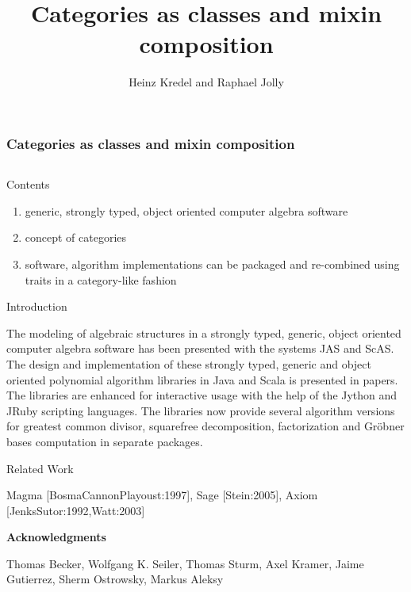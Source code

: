 \documentclass[final]{beamer}
\title[Categories and Mixins]{Categories as classes and mixin composition}
\author[Kredel \& Jolly]{Heinz Kredel\inst{1} and Raphael Jolly\inst{2}}
\institute{IT-Center, University of Mannheim, Germany %
\and Databeans, Paris, France%
}
\begin{document}

\begin{frame}[fragile] 
\frametitle{Categories as classes and mixin composition}
\vfill

\begin{columns}[t]

\begin{column}{.3\linewidth}
 
  \begin{block}{\large Contents}
{\normalsize 
  \begin{enumerate}
  \item generic, strongly typed, object oriented computer algebra software
  \item concept of categories 
  \item software, algorithm implementations can be packaged and
    re-combined using traits in a category-like fashion
  \end{enumerate}
\par}\par
  \end{block}
  \hfill
  \begin{block}{\large Introduction}
{\footnotesize 
The modeling of algebraic structures in a strongly typed, generic,
object oriented computer algebra software has been presented with the
systems JAS and ScAS.
The design and implementation of these strongly typed, generic and
object oriented polynomial algorithm libraries in Java and Scala is
presented in papers.  
The libraries are enhanced for interactive usage with the help of the Jython and
JRuby scripting languages. The libraries now
provide several algorithm versions for greatest common divisor,
squarefree decomposition, factorization and Gr\"obner bases
computation in separate packages.
\par}\par
  \end{block}
  \hfill
  \begin{block}{\large Related Work}
{\normalsize 
Magma [BosmaCannonPlayoust:1997], Sage [Stein:2005], 
Axiom [JenksSutor:1992,Watt:2003]\par
}\par
{\footnotesize\bf Acknowledgments}\par
{\footnotesize Thomas Becker, Wolfgang K. Seiler, Thomas Sturm, Axel Kramer, 
Jaime Gutierrez, Sherm Ostrowsky, Markus Aleksy\par}

\end{block}
\end{column}
\end{columns}
\end{frame}
\end{document}

